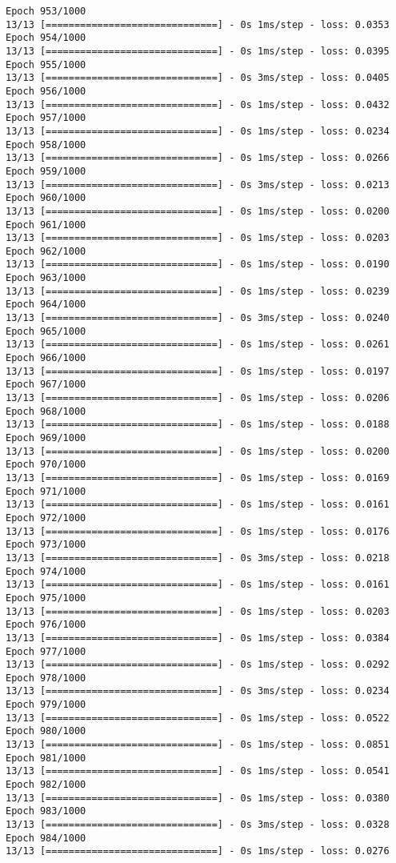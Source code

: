 \documentclass[11pt]{article}
\begin{document}
\begin{Verbatim}[commandchars=\\\{\}]
Epoch 953/1000
13/13 [==============================] - 0s 1ms/step - loss: 0.0353
Epoch 954/1000
13/13 [==============================] - 0s 1ms/step - loss: 0.0395
Epoch 955/1000
13/13 [==============================] - 0s 3ms/step - loss: 0.0405
Epoch 956/1000
13/13 [==============================] - 0s 1ms/step - loss: 0.0432
Epoch 957/1000
13/13 [==============================] - 0s 1ms/step - loss: 0.0234
Epoch 958/1000
13/13 [==============================] - 0s 1ms/step - loss: 0.0266
Epoch 959/1000
13/13 [==============================] - 0s 3ms/step - loss: 0.0213
Epoch 960/1000
13/13 [==============================] - 0s 1ms/step - loss: 0.0200
Epoch 961/1000
13/13 [==============================] - 0s 1ms/step - loss: 0.0203
Epoch 962/1000
13/13 [==============================] - 0s 1ms/step - loss: 0.0190
Epoch 963/1000
13/13 [==============================] - 0s 1ms/step - loss: 0.0239
Epoch 964/1000
13/13 [==============================] - 0s 3ms/step - loss: 0.0240
Epoch 965/1000
13/13 [==============================] - 0s 1ms/step - loss: 0.0261
Epoch 966/1000
13/13 [==============================] - 0s 1ms/step - loss: 0.0197
Epoch 967/1000
13/13 [==============================] - 0s 1ms/step - loss: 0.0206
Epoch 968/1000
13/13 [==============================] - 0s 1ms/step - loss: 0.0188
Epoch 969/1000
13/13 [==============================] - 0s 1ms/step - loss: 0.0200
Epoch 970/1000
13/13 [==============================] - 0s 1ms/step - loss: 0.0169
Epoch 971/1000
13/13 [==============================] - 0s 1ms/step - loss: 0.0161
Epoch 972/1000
13/13 [==============================] - 0s 1ms/step - loss: 0.0176
Epoch 973/1000
13/13 [==============================] - 0s 3ms/step - loss: 0.0218
Epoch 974/1000
13/13 [==============================] - 0s 1ms/step - loss: 0.0161
Epoch 975/1000
13/13 [==============================] - 0s 1ms/step - loss: 0.0203
Epoch 976/1000
13/13 [==============================] - 0s 1ms/step - loss: 0.0384
Epoch 977/1000
13/13 [==============================] - 0s 1ms/step - loss: 0.0292
Epoch 978/1000
13/13 [==============================] - 0s 3ms/step - loss: 0.0234
Epoch 979/1000
13/13 [==============================] - 0s 1ms/step - loss: 0.0522
Epoch 980/1000
13/13 [==============================] - 0s 1ms/step - loss: 0.0851
Epoch 981/1000
13/13 [==============================] - 0s 1ms/step - loss: 0.0541
Epoch 982/1000
13/13 [==============================] - 0s 1ms/step - loss: 0.0380
Epoch 983/1000
13/13 [==============================] - 0s 3ms/step - loss: 0.0328
Epoch 984/1000
13/13 [==============================] - 0s 1ms/step - loss: 0.0276

\end{Verbatim}
\end{document}
